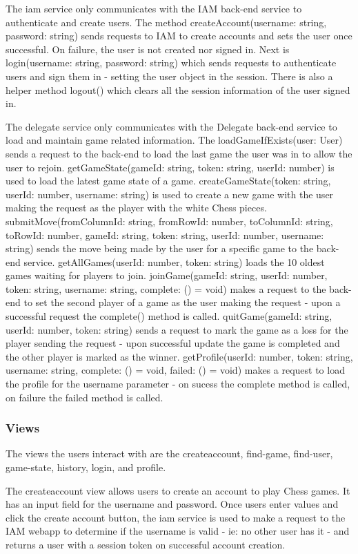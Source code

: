 \documentclass[12pt]{article}
\begin{document}
The iam service only communicates with the IAM back-end service to authenticate and create users. The method 
createAccount(username: string, password: string) sends requests to IAM to create accounts and sets the user once successful. 
On failure, the user is not created nor signed in. Next is login(username: string, password: string) which sends requests to 
authenticate users and sign them in - setting the user object in the session. There is also a helper method logout() which 
clears all the session information of the user signed in.

The delegate service only communicates with the Delegate back-end service to load and maintain game related information. 
The loadGameIfExists(user: User) sends a request to the back-end to load the last game the user was in to allow the user to rejoin. 
getGameState(gameId: string, token: string, userId: number) is used to load the latest game state of a game.
createGameState(token: string, userId: number, username: string) is used to create a new game with the user making the request 
as the player with the white Chess pieces. submitMove(fromColumnId: string, fromRowId: number, toColumnId: string, toRowId: number, 
gameId: string, token: string, userId: number, username: string) sends the move being made by the user for a specific game to the back-end service. 
getAllGames(userId: number, token: string) loads the 10 oldest games waiting for players to join. 
joinGame(gameId: string, userId: number, token: string, username: string, complete: () =\> void) makes a request to the back-end to 
set the second player of a game as the user making the request - upon a successful request the complete() method is called. 
quitGame(gameId: string, userId: number, token: string) sends a request to mark the game as a loss for the player sending the 
request - upon successful update the game is completed and the other player is marked as the winner. 
getProfile(userId: number, token: string, username: string, complete: () =\> void, failed: () =\> void) makes a request to load the profile 
for the username parameter - on sucess the complete method is called, on failure the failed method is called.

\subsubsection{Views}
The views the users interact with are the createaccount, find-game, find-user, game-state, history, login,
and profile.

The createaccount view allows users to create an account to play Chess games. It has an input field for the 
username and password. Once users enter values and click the create account button, the iam service is used 
to make a request to the IAM webapp to determine if the username is valid - ie: no other user has it - and returns a 
user with a session token on successful account creation.
\end{document}
